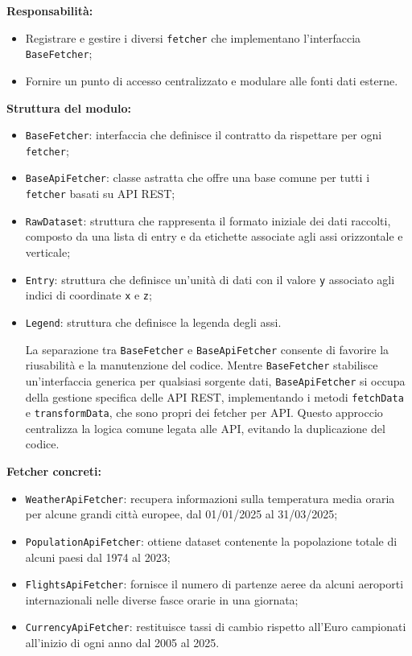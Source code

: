 \textbf{Responsabilità:}
\begin{itemize}
    \item Registrare e gestire i diversi \texttt{fetcher} che implementano l’interfaccia \texttt{BaseFetcher};
    \item Fornire un punto di accesso centralizzato e modulare alle fonti dati esterne.
\end{itemize}

\textbf{Struttura del modulo:}
\begin{itemize}
    \item \texttt{BaseFetcher}: interfaccia che definisce il contratto da rispettare per ogni \texttt{fetcher};
    \item \texttt{BaseApiFetcher}: classe astratta che offre una base comune per tutti i \texttt{fetcher} basati su API REST;
    \item \texttt{RawDataset}: struttura che rappresenta il formato iniziale dei dati raccolti, composto da una lista di entry e da etichette associate agli assi orizzontale e verticale;
    \item \texttt{Entry}: struttura che definisce un'unità di dati con il valore \texttt{y} associato agli indici di coordinate \texttt{x} e \texttt{z};
    \item \texttt{Legend}: struttura che definisce la legenda degli assi.
    
    La separazione tra \texttt{BaseFetcher} e \texttt{BaseApiFetcher} consente di favorire la riusabilità e la manutenzione del codice. Mentre \texttt{BaseFetcher} stabilisce un'interfaccia generica per qualsiasi sorgente dati, \texttt{BaseApiFetcher} si occupa della gestione specifica delle API REST, implementando i metodi \texttt{fetchData} e \texttt{transformData}, che sono propri dei fetcher per API. Questo approccio centralizza la logica comune legata alle API, evitando la duplicazione del codice.
    
\end{itemize}

\textbf{Fetcher concreti:}
\begin{itemize}
    \item \texttt{WeatherApiFetcher}: recupera informazioni sulla temperatura media oraria per alcune grandi città europee, dal 01/01/2025 al 31/03/2025;
    \item \texttt{PopulationApiFetcher}: ottiene dataset contenente la popolazione totale di alcuni paesi dal 1974 al 2023;
    \item \texttt{FlightsApiFetcher}: fornisce il numero di partenze aeree da alcuni aeroporti internazionali nelle diverse fasce orarie in una giornata;
    \item \texttt{CurrencyApiFetcher}: restituisce tassi di cambio rispetto all'Euro campionati all'inizio di ogni anno dal 2005 al 2025.
\end{itemize}

